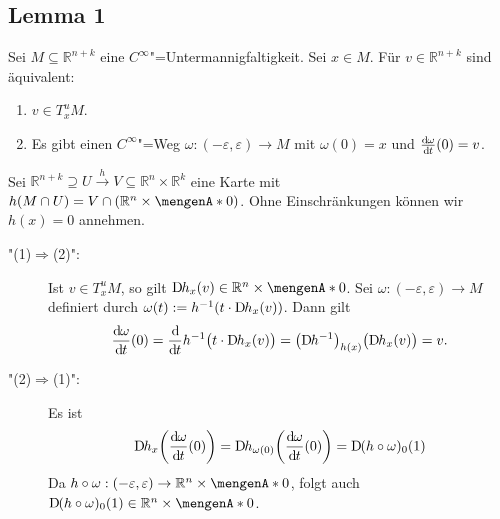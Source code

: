 \subsection[Lemma 1: Vektoren in $T^u_x M$ sind Geschwindigkeitsvektoren von Wegen durch $x$]{Lemma 1} %
\label{sub:184}
Sei $M \subseteq \mathds{R}^{n+k}$ eine $C^\infty$"=Untermannigfaltigkeit. Sei $x \in M$. Für $v \in \mathds{R}^{n+k}$ sind äquivalent:
\begin{enumerate}[(1)]
	\item $v \in T^u_x M$.
	\item Es gibt einen $C^\infty$"=Weg $\omega : (-\varepsilon, \varepsilon) \to M$ mit $\omega(0)=x$ und $\frac{\mathrm{d}\mkern-1.0mu \omega}{\mathrm{d}\mkern-1.0mu t} (0)=v$.
\end{enumerate}
Sei $\mathds{R}^{n+k} \supseteq U \xrightarrow{h} V \subseteq \mathds{R}^n \times \mathds{R}^k $ eine Karte mit $h(M \cap U) = V \cap (\mathds{R}^n \times \set{0})$.
Ohne Einschränkungen können wir $h(x)=0$ annehmen.
\begin{description}
	\item["(1)$\Rightarrow$(2)":] Ist $v \in T_x^u M$, so gilt $\D h_x (v) \in \mathds{R}^n \times \set{0}$. Sei $\omega : (-\varepsilon,\varepsilon) \to M$ definiert durch
	$\omega(t) := h ^{-1} \enbrace*{t \cdot \D h_x(v)}$. Dann gilt
	\begin{align*}
		\diffd{\omega}{t}(0) = \diffd{}{t} h ^{-1} \enbrace[\big]{t \cdot \D h_x(v)} = \enbrace*{\D h ^{-1}}_{h(x)} \enbrace[\big]{\D h_x (v)} = v.
	\end{align*}
	\item["(2)$\Rightarrow$(1)":] Es ist 
	\begin{align*}
		\D h_x \enbrace*{\diffd{\omega}{t}(0)} = \D h_{\omega(0)} \enbrace*{\diffd{\omega}{t}(0)} = \D(h \circ \omega)_0 (1) 
	\end{align*}
	Da $h \circ \omega : (-\varepsilon,\varepsilon) \to \mathds{R}^n \times \set{0}$, folgt auch $\D(h \circ \omega)_0 (1) \in \mathds{R}^n \times \set{0}$. \bewende
\end{description}

